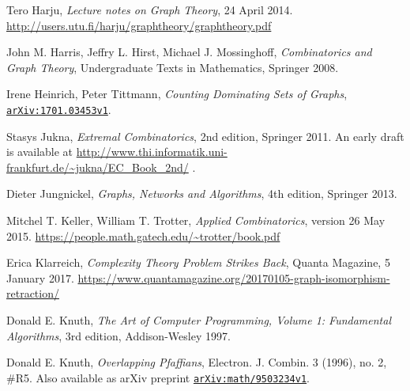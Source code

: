 \documentclass[numbers=enddot,12pt,final,onecolumn,notitlepage]{scrartcl}%
\theoremstyle{definition}
\newcommand\arxiv[1]{\href{http://www.arxiv.org/abs/#1}{\texttt{arXiv:#1}}}
\begin{document}
\begin{thebibliography}{9999999999}
Tero Harju,
\textit{Lecture notes on Graph Theory},
24 April 2014.
\newline\url{http://users.utu.fi/harju/graphtheory/graphtheory.pdf}

John M. Harris, Jeffry L. Hirst, Michael J. Mossinghoff,
\textit{Combinatorics and Graph Theory}, Undergraduate Texts in
Mathematics, Springer 2008.


Irene Heinrich, Peter Tittmann,
\textit{Counting Dominating Sets of Graphs},
\arxiv{1701.03453v1}.

Stasys Jukna,
\textit{Extremal Combinatorics}, 2nd edition, Springer 2011.
An early draft is available at
\url{http://www.thi.informatik.uni-frankfurt.de/~jukna/EC_Book_2nd/} .

Dieter Jungnickel,
\textit{Graphs, Networks and Algorithms},
4th edition, Springer 2013.


Mitchel T. Keller, William T. Trotter,
\textit{Applied Combinatorics},
version 26 May 2015.
\newline \url{https://people.math.gatech.edu/~trotter/book.pdf}

Erica Klarreich,
\textit{Complexity Theory Problem Strikes Back},
Quanta Magazine, 5 January 2017.
\newline \url{https://www.quantamagazine.org/20170105-graph-isomorphism-retraction/}

Donald E. Knuth,
\textit{The Art of Computer Programming, Volume 1: Fundamental
Algorithms},
3rd edition, Addison-Wesley 1997.

 Donald E. Knuth,
\textit{Overlapping Pfaffians},
Electron. J. Combin. 3 (1996), no. 2, \#R5.
Also available as arXiv preprint \arxiv{math/9503234v1}.



\end{thebibliography}
\end{document}
